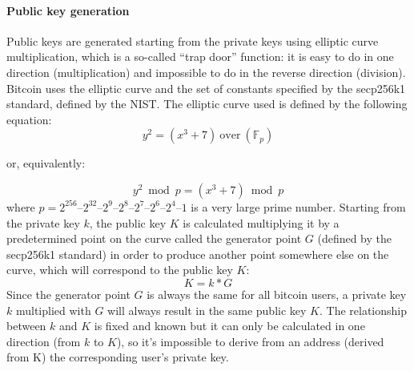 \paragraph{Public key generation}
Public keys are generated starting from the private keys using elliptic curve
multiplication, which is a so-called ``trap door'' function: it is easy to do in
one direction (multiplication) and impossible to do in the reverse direction (division).
Bitcoin uses the elliptic curve and the set of constants specified by the secp256k1
standard, defined by the NIST. The elliptic curve used is defined by the following
equation:
\begin{equation}\label{eq:bitcoin-curve}
  y^2 = (x^3 + 7)~\text{over}~(\mathbb{F}_p)
\end{equation}
\begin{center}
  or, equivalently:
\end{center}
\begin{equation}
  y^2 \bmod p = (x^3 + 7) \bmod p
\end{equation}
where $p = 2^{256} – 2^{32} – 2^9 – 2^8 – 2^7 – 2^6 – 2^4 – 1$ is a very large prime number.
Starting from the private key $k$, the public key $K$ is calculated multiplying
it by a predetermined point on the curve called the generator point $G$ (defined
by the secp256k1 standard) in order to produce another point somewhere else on
the curve, which will correspond to the public key $K$:
\[K = k * G\]
Since the generator point $G$ is always the same for all bitcoin users, a
private key $k$ multiplied with $G$ will always result in the same public key $K$.
The relationship between $k$ and $K$ is fixed and known but it can only be
calculated in one direction (from $k$ to $K$), so it's impossible to derive from
an address (derived from K) the corresponding user's private key.

